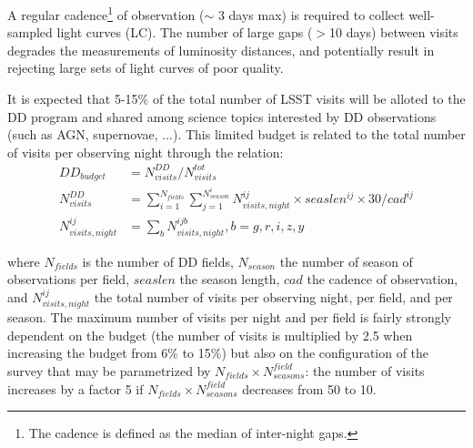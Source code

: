 \documentclass[\docopts]{\docclass}
\begin{document}
\par
A regular cadence\footnote{The cadence is defined as the median of inter-night gaps.} of observation ($\sim$ 3 days max) is required to collect well-sampled light curves (LC). The number of large gaps ($>$10 days) between visits degrades the 
measurements of luminosity distances, and potentially result in rejecting large sets of light curves of poor quality.
\par
It is expected that 5-15$\%$ of the total number of LSST visits will be alloted to the DD program and shared among science topics interested by DD observations (such as AGN, supernovae, ...).  This limited budget is related to the total number of visits per observing night through the relation:
\begin{equation}\label{eq:ddbudget}
\begin{aligned}
DD_{budget} &= N_{visits}^{DD}/N_{visits}^{tot} \\
  N_{visits}^{DD} &= \sum_{i=1}^{N_{fields}} \sum_{ j=1}^{N_{season}^i} N_{visits,night}^{ij}\times seaslen^{ij}\times 30/cad^{ij} \\
  N_{visits,night}^{ij} &=  \sum_{b} N_{visits,night}^{ijb}   , b=g,r,i,z,y
 \end{aligned}
 \end{equation}

where $N_{fields}$ is the number of DD fields, $N_{season}$ the number of season of observations per field, $seaslen$ the season length, $cad$ the cadence of observation, and $N_{visits, night}^{ij}$ the total number of visits per observing night, per field, and per season. The maximum number of visits per night and per field is fairly strongly dependent on the budget (the number of visits is multiplied by 2.5 when increasing the budget from 6\% to 15\%) but also on the configuration of the survey that may be parametrized by $N_{fields}\times N_{seasons}^{field}$: the number of visits increases by a factor 5 if $N_{fields}\times N_{seasons}^{field}$ decreases from 50 to 10.
\end{document}
